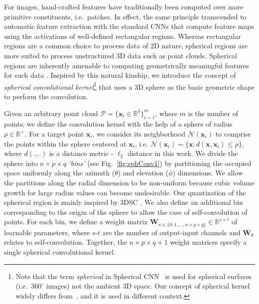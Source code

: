 \documentclass[10pt,twocolumn,letterpaper]{article}
\begin{document}
For images, hand-crafted features have traditionally been computed over more primitive constituents, i.e.~patches. In effect, the same principle transcended to automatic feature extraction with the standard CNNs that compute feature maps using the activations of well-defined rectangular regions. Whereas rectangular regions are a common choice to process data of 2D nature, spherical regions are more suited to process unstructured 3D data such as point clouds. Spherical regions are inherently amenable to computing geometrically meaningful features for such data \cite{frome2004recognizing,tombari2010unique,tombari2010uniqueACM}.
Inspired by this natural kinship, we introduce the concept of \textit{spherical convolutional kernel}\footnote{Note that the term \emph{spherical} in Spherical CNN~\cite{cohen2018spherical} is used for spherical surfaces (i.e.~$360^\circ$ images) not the ambient 3D space. Our concept of spherical kernel widely differs from~\cite{cohen2018spherical}, and it is used in different context.} that uses a 3D sphere as the basic geometric shape to perform the convolution. 

Given an arbitrary point cloud $\mathcal{P}=\{\mathbf{x}_i\in \mathbb{R}^3\}_{i=1}^m$, where $m$ is the number of points; we define the convolution kernel with the help of a sphere of radius $\rho\in \mathbb{R}^+$. For a target point $\mathbf{x}_i$, we consider its neighborhood $\mathcal{N}(\mathbf{x}_i)$ to comprise the points within the sphere centered at $\mathbf{x}_i$,  i.e. $\mathcal{N}(\mathbf{x}_i)=\{\mathbf{x}:d(\mathbf{x},\mathbf{x}_i)\leq \rho\}$, where $d(.,.)$ is a distance metric - $\ell_2$ distance in this work.
We divide the sphere into $n \times p \times q$ \emph{`bins'} (see Fig.~\ref{fig:sphConv1}) by partitioning the occupied space uniformly along the azimuth ($\theta$) and elevation ($\phi$) dimensions. We allow the partitions along the radial dimension  to be non-uniform because cubic volume growth for large radius values can become undesirable.
Our quantization of the spherical region is mainly inspired by  3DSC \cite{frome2004recognizing}.
We also define an additional bin corresponding to the origin of the sphere to allow the case of self-convolution of points.
For each bin, we define a weight matrix $\mathbf{W}_{\kappa \in \{0, 1,\dots,n \times p \times q \}}\in\mathbb{R}^{s\times t}$ of learnable parameters, where $s$-$t$ are the number of output-input channels and $\mathbf{W}_0$ relates to self-convolution.  Together, the $n \times p \times q + 1$ weight matrices specify a single spherical convolutional kernel.
\end{document}
